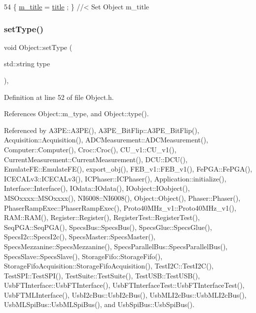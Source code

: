 \begin{DoxyCode}
54 \{ \hyperlink{classObject_affbeea1953eb5163573b92fad8f75727}{m\_title} = \hyperlink{classObject_a73a0f1a41828fdd8303dd662446fb6c3}{title} ; \} \textcolor{comment}{//< Set Object m\_title}
\end{DoxyCode}
\mbox{\label{classObject_aae534cc9d982bcb9b99fd505f2e103a5}} 
\subsubsection{\texorpdfstring{set\+Type()}{setType()}}
{\footnotesize\ttfamily void Object\+::set\+Type (\begin{DoxyParamCaption}\item[{std\+::string}]{type }\end{DoxyParamCaption})\hspace{0.3cm}{\ttfamily [inline]}, {\ttfamily [inherited]}}



Definition at line 52 of file Object.\+h.



References Object\+::m\+\_\+type, and Object\+::type().



Referenced by A3\+P\+E\+::\+A3\+P\+E(), A3\+P\+E\+\_\+\+Bit\+Flip\+::\+A3\+P\+E\+\_\+\+Bit\+Flip(), Acquisition\+::\+Acquisition(), A\+D\+C\+Measurement\+::\+A\+D\+C\+Measurement(), Computer\+::\+Computer(), Croc\+::\+Croc(), C\+U\+\_\+v1\+::\+C\+U\+\_\+v1(), Current\+Measurement\+::\+Current\+Measurement(), D\+C\+U\+::\+D\+C\+U(), Emulate\+F\+E\+::\+Emulate\+F\+E(), export\+\_\+obj(), F\+E\+B\+\_\+v1\+::\+F\+E\+B\+\_\+v1(), Fe\+P\+G\+A\+::\+Fe\+P\+G\+A(), I\+C\+E\+C\+A\+Lv3\+::\+I\+C\+E\+C\+A\+Lv3(), I\+C\+Phaser\+::\+I\+C\+Phaser(), Application\+::initialize(), Interface\+::\+Interface(), I\+Odata\+::\+I\+Odata(), I\+Oobject\+::\+I\+Oobject(), M\+S\+Oxxxx\+::\+M\+S\+Oxxxx(), N\+I6008\+::\+N\+I6008(), Object\+::\+Object(), Phaser\+::\+Phaser(), Phaser\+Ramp\+Exec\+::\+Phaser\+Ramp\+Exec(), Proto40\+M\+Hz\+\_\+v1\+::\+Proto40\+M\+Hz\+\_\+v1(), R\+A\+M\+::\+R\+A\+M(), Register\+::\+Register(), Register\+Test\+::\+Register\+Test(), Seq\+P\+G\+A\+::\+Seq\+P\+G\+A(), Specs\+Bus\+::\+Specs\+Bus(), Specs\+Glue\+::\+Specs\+Glue(), Specs\+I2c\+::\+Specs\+I2c(), Specs\+Master\+::\+Specs\+Master(), Specs\+Mezzanine\+::\+Specs\+Mezzanine(), Specs\+Parallel\+Bus\+::\+Specs\+Parallel\+Bus(), Specs\+Slave\+::\+Specs\+Slave(), Storage\+Fifo\+::\+Storage\+Fifo(), Storage\+Fifo\+Acquisition\+::\+Storage\+Fifo\+Acquisition(), Test\+I2\+C\+::\+Test\+I2\+C(), Test\+S\+P\+I\+::\+Test\+S\+P\+I(), Test\+Suite\+::\+Test\+Suite(), Test\+U\+S\+B\+::\+Test\+U\+S\+B(), Usb\+F\+T\+Interface\+::\+Usb\+F\+T\+Interface(), Usb\+F\+T\+Interface\+Test\+::\+Usb\+F\+T\+Interface\+Test(), Usb\+F\+T\+M\+L\+Interface(), Usb\+I2c\+Bus\+::\+Usb\+I2c\+Bus(), Usb\+M\+L\+I2c\+Bus\+::\+Usb\+M\+L\+I2c\+Bus(), Usb\+M\+L\+Spi\+Bus\+::\+Usb\+M\+L\+Spi\+Bus(), and Usb\+Spi\+Bus\+::\+Usb\+Spi\+Bus().



